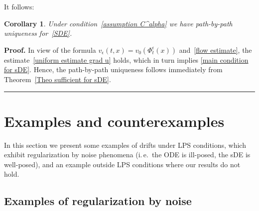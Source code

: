 \documentclass[a4paper,10pt]{article}
\newtheorem{corollary}[theorem]{Corollary}
\newenvironment{proof}[1][Proof]{\noindent\textbf{#1.} }{\ \rule{0.5em}{0.5em}}
\newcommand{\eps}{\epsilon}
\begin{document}
It follows:

\begin{corollary}
\label{Corollary sDE Holder}Under condition~\eqref{assumption C^alpha} we have
path-by-path uniqueness for~\eqref{SDE}.
\end{corollary}

\begin{proof}
In view of the formula $v_{\epsilon}(t,x)  =v_{0}(\Phi^{\eps}_t(x))$ and~\eqref{flow estimate}, the estimate~\eqref{uniform estimate grad u} holds, which in turn implies \eqref{main condition for sDE}. Hence, the path-by-path uniqueness follows immediately from Theorem~\ref{Theo sufficient for sDE}.
\end{proof}


\section{Examples and counterexamples}\label{ex_section}

In this section we present some examples of drifts under LPS conditions, which exhibit regularization by noise phenomena (i.\,e.\ the ODE is ill-posed, the sDE is well-posed), and an example outside LPS conditions where our results do not hold.

\subsection{Examples of regularization by noise}
\end{document}
